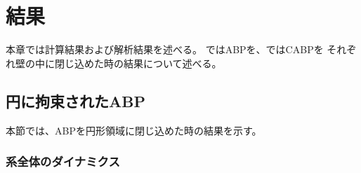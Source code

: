 \documentclass[/Users/ikedahajime/GitHub/reserch/master_report/thesis]{subfiles}
\begin{document}
\chapter{結果}
本章では計算結果および解析結果を述べる。
ではABPを、ではCABPを
それぞれ壁の中に閉じ込めた時の結果について述べる。
\section{円に拘束されたABP}\label{sec:result_abp}
本節では、ABPを円形領域に閉じ込めた時の結果を示す。
\subsection{系全体のダイナミクス}
\end{document}
